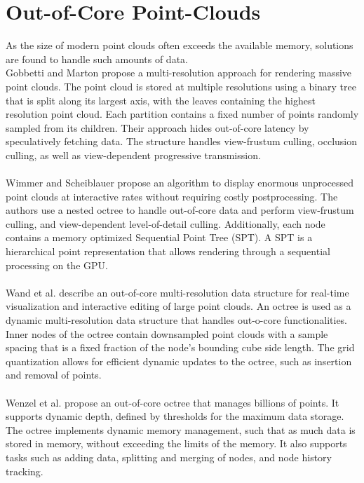 \section {Out-of-Core Point-Clouds}
\label{sec:related_work_point_clouds}
As the size of modern point clouds often exceeds the available memory, solutions are found to handle such amounts of data. 
\\
Gobbetti and Marton \cite{gobbetti2004layered} propose a multi-resolution approach for rendering massive point clouds. The point cloud is stored at multiple resolutions using a binary tree that is split along its largest axis, with the leaves containing the highest resolution point cloud. Each partition contains a fixed number of points randomly sampled from its children. Their approach hides out-of-core latency by speculatively fetching data. The structure handles view-frustum culling, occlusion culling, as well as view-dependent progressive transmission.
\\
\\
Wimmer and Scheiblauer \cite{wimmer2006instant} propose an algorithm to display enormous unprocessed point clouds at interactive rates without requiring costly postprocessing. The authors use a nested octree to handle out-of-core data and perform view-frustum culling, and view-dependent level-of-detail culling. Additionally, each node contains a memory optimized Sequential Point Tree (SPT). A SPT is a hierarchical point representation that allows rendering through a sequential processing on the GPU.  
\\
\\
Wand et al. \cite{wand2007interactive} describe an out-of-core multi-resolution data structure for real-time visualization and interactive editing of large point clouds. An octree is used as a dynamic multi-resolution data structure that handles out-o-core functionalities. Inner nodes of the octree contain downsampled point clouds with a sample spacing that is a fixed fraction of the node's bounding cube side length. The grid quantization allows for efficient dynamic updates to the octree, such as insertion and removal of points. 
\\
\\
Wenzel et al. \cite{wenzel2014out} propose an out-of-core octree that manages billions of points. It supports dynamic depth, defined by thresholds for the maximum data storage. The octree implements dynamic memory management, such that as much data is stored in memory, without exceeding the limits of the memory. It also supports tasks such as adding data, splitting and merging of nodes, and node history tracking. 
